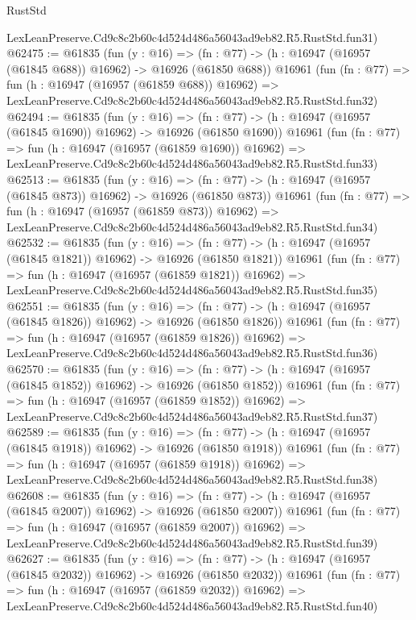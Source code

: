 \begin{lexlean}{RustStd}
\begin{coremodule}
    LexLeanPreserve.Cd9c8c2b60c4d524d486a56043ad9eb82.R5.RustStd.fun31)
@62475 := @61835
    (fun (y : @16) =>
    (fn : @77) -> (h : @16947 (@16957 (@61845 @688)) @16962) -> @16926 (@61850 @688))
    @16961
    (fun (fn : @77) =>
    fun (h : @16947 (@16957 (@61859 @688)) @16962) =>
    LexLeanPreserve.Cd9c8c2b60c4d524d486a56043ad9eb82.R5.RustStd.fun32)
@62494 := @61835
    (fun (y : @16) =>
    (fn : @77) -> (h : @16947 (@16957 (@61845 @1690)) @16962) -> @16926 (@61850 @1690))
    @16961
    (fun (fn : @77) =>
    fun (h : @16947 (@16957 (@61859 @1690)) @16962) =>
    LexLeanPreserve.Cd9c8c2b60c4d524d486a56043ad9eb82.R5.RustStd.fun33)
@62513 := @61835
    (fun (y : @16) =>
    (fn : @77) -> (h : @16947 (@16957 (@61845 @873)) @16962) -> @16926 (@61850 @873))
    @16961
    (fun (fn : @77) =>
    fun (h : @16947 (@16957 (@61859 @873)) @16962) =>
    LexLeanPreserve.Cd9c8c2b60c4d524d486a56043ad9eb82.R5.RustStd.fun34)
@62532 := @61835
    (fun (y : @16) =>
    (fn : @77) -> (h : @16947 (@16957 (@61845 @1821)) @16962) -> @16926 (@61850 @1821))
    @16961
    (fun (fn : @77) =>
    fun (h : @16947 (@16957 (@61859 @1821)) @16962) =>
    LexLeanPreserve.Cd9c8c2b60c4d524d486a56043ad9eb82.R5.RustStd.fun35)
@62551 := @61835
    (fun (y : @16) =>
    (fn : @77) -> (h : @16947 (@16957 (@61845 @1826)) @16962) -> @16926 (@61850 @1826))
    @16961
    (fun (fn : @77) =>
    fun (h : @16947 (@16957 (@61859 @1826)) @16962) =>
    LexLeanPreserve.Cd9c8c2b60c4d524d486a56043ad9eb82.R5.RustStd.fun36)
@62570 := @61835
    (fun (y : @16) =>
    (fn : @77) -> (h : @16947 (@16957 (@61845 @1852)) @16962) -> @16926 (@61850 @1852))
    @16961
    (fun (fn : @77) =>
    fun (h : @16947 (@16957 (@61859 @1852)) @16962) =>
    LexLeanPreserve.Cd9c8c2b60c4d524d486a56043ad9eb82.R5.RustStd.fun37)
@62589 := @61835
    (fun (y : @16) =>
    (fn : @77) -> (h : @16947 (@16957 (@61845 @1918)) @16962) -> @16926 (@61850 @1918))
    @16961
    (fun (fn : @77) =>
    fun (h : @16947 (@16957 (@61859 @1918)) @16962) =>
    LexLeanPreserve.Cd9c8c2b60c4d524d486a56043ad9eb82.R5.RustStd.fun38)
@62608 := @61835
    (fun (y : @16) =>
    (fn : @77) -> (h : @16947 (@16957 (@61845 @2007)) @16962) -> @16926 (@61850 @2007))
    @16961
    (fun (fn : @77) =>
    fun (h : @16947 (@16957 (@61859 @2007)) @16962) =>
    LexLeanPreserve.Cd9c8c2b60c4d524d486a56043ad9eb82.R5.RustStd.fun39)
@62627 := @61835
    (fun (y : @16) =>
    (fn : @77) -> (h : @16947 (@16957 (@61845 @2032)) @16962) -> @16926 (@61850 @2032))
    @16961
    (fun (fn : @77) =>
    fun (h : @16947 (@16957 (@61859 @2032)) @16962) =>
    LexLeanPreserve.Cd9c8c2b60c4d524d486a56043ad9eb82.R5.RustStd.fun40)

\end{coremodule}
\end{lexlean}
